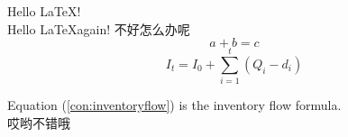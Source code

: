 \documentclass{article}
\begin{document}
    Hello \LaTeX!\\
    Hello \LaTeX again!
    不好怎么办呢
    \begin{equation}\label{con:inventoryflow}
        a+b=c 
    \end{equation}
    \begin{equation}
    I_{t}=I_{0}+\sum_{i=1}^{t}(Q_{i}-d_{i})
    \end{equation}
 
 
Equation (\ref{con:inventoryflow}) is the inventory flow formula.\\
哎哟不错哦
\end{document}
